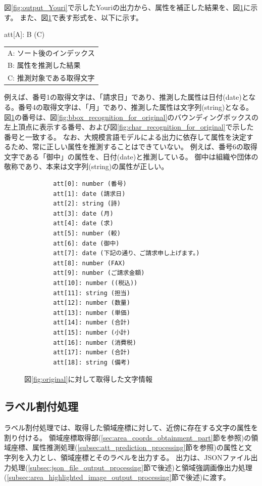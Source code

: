 図\ref{fig:output_Youri}で示したYouriの出力から、属性を補正した結果を、図\ref{fig:predict_att_for_original}に示す。
また、図\ref{fig:predict_att_for_original}で表す形式を、以下に示す。

\begin{center}
    att[A]: B (C)
\end{center}

\begin{center}
    \begin{tabular}{l}
        A: ソート後のインデックス\\
        B: 属性を推測した結果\\
        C: 推測対象である取得文字\\
    \end{tabular}
\end{center}

例えば、番号1の取得文字は、「請求日」であり、推測した属性は日付(date)となる。番号4の取得文字は、「月」であり、推測した属性は文字列(string)となる。
図\ref{fig:predict_att_for_original}の番号は、図\ref{fig:bbox_recognition_for_original}のバウンディングボックスの左上頂点に表示する番号、および図\ref{fig:char_recognition_for_original}で示した番号と一致する。
なお、大規模言語モデルによる出力に依存して属性を決定するため、常に正しい属性を推測することはできていない。
例えば、番号6の取得文字である「御中」の属性を、日付(date)と推測している。
御中は組織や団体の敬称であり、本来は文字列(string)の属性が正しい。

\lstset{language=}
\begin{figure}[t]
    \begin{lstlisting}
        att[0]: number (番号)
        att[1]: date (請求日)
        att[2]: string (詩)
        att[3]: date (月)
        att[4]: date (求)
        att[5]: number (較)
        att[6]: date (御中)
        att[7]: date (下記の通り、ご請求申し上げます。)
        att[8]: number (FAX)
        att[9]: number (ご請求金額)
        att[10]: number ((税込))
        att[11]: string (担当)
        att[12]: number (数量)
        att[13]: number (単価)
        att[14]: number (合計)
        att[15]: number (小計)
        att[16]: number (消費税)
        att[17]: number (合計)
        att[18]: string (備考)
    \end{lstlisting}
    \caption{図\ref{fig:original}に対して取得した文字情報}
    \label{fig:predict_att_for_original}
\end{figure}

\subsection{ラベル割付処理}\label{subsec:label_link_processing}
ラベル割付処理では、取得した領域座標に対して、近傍に存在する文字の属性を割り付ける。
領域座標取得部(\ref{sec:area_coords_obtainment_part}節を参照)の領域座標、属性推測処理(\ref{subsec:att_prediction_processing}節を参照)の属性と文字列を入力とし、領域座標とそのラベルを出力する。
出力は、JSONファイル出力処理(\ref{subsec:json_file_output_processing}節で後述)と領域強調画像出力処理(\ref{subsec:area_highlighted_image_output_processing}節で後述)に渡す。


